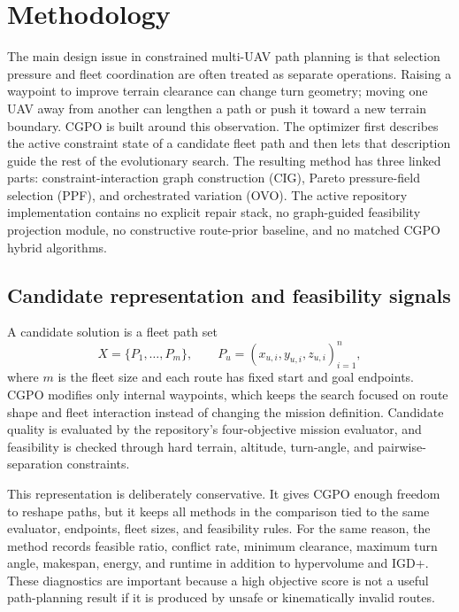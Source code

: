 
\section{Methodology}
\label{sec:methodology}

The main design issue in constrained multi-UAV path planning is that selection pressure and fleet coordination are often treated as separate operations. Raising a waypoint to improve terrain clearance can change turn geometry; moving one UAV away from another can lengthen a path or push it toward a new terrain boundary. CGPO is built around this observation. The optimizer first describes the active constraint state of a candidate fleet path and then lets that description guide the rest of the evolutionary search. The resulting method has three linked parts: constraint-interaction graph construction (CIG), Pareto pressure-field selection (PPF), and orchestrated variation (OVO). The active repository implementation contains no explicit repair stack, no graph-guided feasibility projection module, no constructive route-prior baseline, and no matched CGPO hybrid algorithms.

\subsection{Candidate representation and feasibility signals}
\label{subsec:candidate-representation}

A candidate solution is a fleet path set
\[
X=\{P_1,\ldots,P_m\}, \qquad
P_u=(x_{u,i},y_{u,i},z_{u,i})_{i=1}^{n},
\]
where $m$ is the fleet size and each route has fixed start and goal endpoints. CGPO modifies only internal waypoints, which keeps the search focused on route shape and fleet interaction instead of changing the mission definition. Candidate quality is evaluated by the repository's four-objective mission evaluator, and feasibility is checked through hard terrain, altitude, turn-angle, and pairwise-separation constraints.

This representation is deliberately conservative. It gives CGPO enough freedom to reshape paths, but it keeps all methods in the comparison tied to the same evaluator, endpoints, fleet sizes, and feasibility rules. For the same reason, the method records feasible ratio, conflict rate, minimum clearance, maximum turn angle, makespan, energy, and runtime in addition to hypervolume and IGD+. These diagnostics are important because a high objective score is not a useful path-planning result if it is produced by unsafe or kinematically invalid routes.

